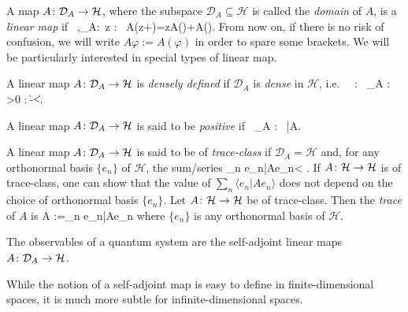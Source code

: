 \bd
A map $A\colon\mathcal{D}_A\to \mathcal{H}$, where the subspace $\mathcal{D}_A\subseteq \mathcal{H}$ is called the \emph{domain} of $A$, is a \emph{linear map} if
\bse
\forall \, \varphi,\psi\in{}_A:\forall \, z \in \C : \ A(z\varphi+\psi)=zA(\varphi)+A(\psi).
\ese
\ed
From now on, if there is no risk of confusion, we will write $A\varphi:=A(\varphi)$ in order to spare some brackets. We will be particularly interested in special types of linear map.




\bd
A linear map $A\colon\mathcal{D}_A\to \mathcal{H}$ is \emph{densely defined} if $\mathcal{D}_A$ is \emph{dense} in $\mathcal{H}$, i.e.\
\bse
\forall \, \psi\in {} : \exists \, \alpha \in {}_A : \forall \, \varepsilon >0 :\ \|\alpha-\psi\|<\varepsilon.
\ese
\ed

\bd
A linear map $A\colon\mathcal{D}_A\to \mathcal{H}$ is said to be \emph{positive} if 
\bse
\forall \, \psi\in{}_A : \ \langle\psi|A\psi\rangle{}.
\ese
\ed


\bd
A linear map $A\colon\mathcal{D}_A\to \mathcal{H}$ is said to be of \emph{trace-class} if $\mathcal{D}_A=\mathcal{H}$ and, for any orthonormal basis $\{e_n\}$ of $\mathcal{H}$, the sum/series
\bse
\sum_n \langle e_n|Ae_n\rangle < \infty.
\ese
\ed
If $A\colon\mathcal{H}\to \mathcal{H}$ is of trace-class, one can show that the value of $\sum_n \langle e_n|Ae_n\rangle$ does not depend on the choice of orthonormal basis $\{e_n\}$. 
\bd
Let $A\colon\mathcal{H}\to \mathcal{H}$ be of trace-class. Then the \emph{trace} of $A$ is
\bse
\Tr A :=\sum_n \langle e_n|Ae_n\rangle 
\ese
where $\{e_n\}$ is any orthonormal basis of $\mathcal{H}$.
\ed
\begin{tcolorbox}[colframe=blue!10!black]
\begin{axiom}[Observables]
The observables of a quantum system are the self-adjoint linear maps $A\colon\mathcal{D}_A\to \mathcal{H}$.
\end{axiom}
\end{tcolorbox}
While the notion of a self-adjoint map is easy to define in finite-dimensional spaces, it is much more subtle for infinite-dimensional spaces.

